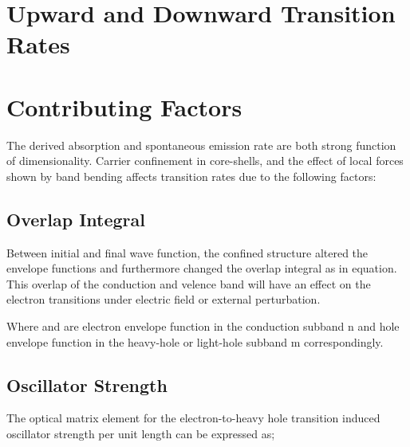
\section{Upward and Downward Transition Rates} \label{rates}

\section{Contributing Factors} \label{factor}

The derived absorption and spontaneous emission rate are both strong function
of dimensionality. Carrier confinement in core-shells, and the effect of local
forces shown by band bending affects transition rates due to the following
factors:

\subsection{Overlap Integral}

Between initial and final wave function, the confined structure altered the
envelope functions and furthermore changed the overlap integral as in equation.
This overlap of the conduction and velence band will have an effect on the
electron transitions under electric field or external perturbation.

Where and are electron envelope function in the conduction subband n and hole
envelope function in the heavy-hole or light-hole subband m correspondingly.

\subsection{Oscillator Strength}

The optical matrix element for the electron-to-heavy hole transition induced oscillator strength per unit length can be expressed as;

